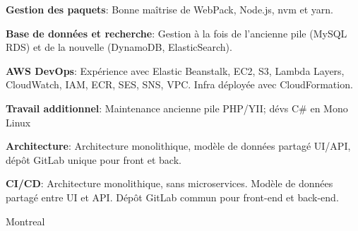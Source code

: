 \documentclass[
  a4paper,
   maincolor=cvblue,
   sectioncolor=cvblue,
   sidebarwidth=0.323\paperwidth,
]{fortysecondscv}
\begin{document}
\begin{cvtableNew}
{        \textbf{Gestion des paquets}: Bonne maîtrise de WebPack, Node.js, nvm et yarn.\vspace{5pt}

        \textbf{Base de données et recherche}: Gestion à la fois de l’ancienne pile (MySQL RDS) et de la nouvelle (DynamoDB, ElasticSearch).\vspace{5pt}

        \textbf{AWS DevOps}: Expérience avec Elastic Beanstalk, EC2, S3, Lambda Layers, CloudWatch, IAM, ECR, SES, SNS, VPC. Infra déployée avec CloudFormation.\vspace{5pt}

        \textbf{Travail additionnel}: Maintenance ancienne pile PHP/YII; dévs C\# en Mono Linux\vspace{5pt}

        \textbf{Architecture}: Architecture monolithique, modèle de données partagé UI/API, dépôt GitLab unique pour front et back.\vspace{5pt}

        \textbf{CI/CD}: Architecture monolithique, sans microservices. Modèle de données partagé entre UI et API. Dépôt GitLab commun pour front-end et back-end.
      }
    {Montreal} %
\end{cvtableNew}








\newpage
\makebacksidebar
\end{document}
